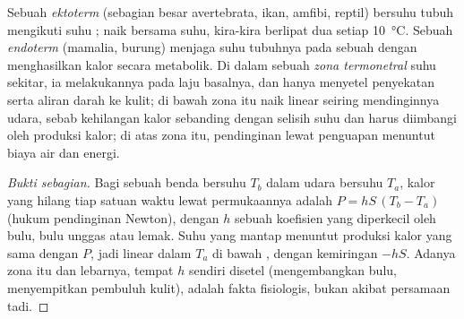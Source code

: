 \begin{proposition}\label{prop:b1:organism-environment:thermo}
Sebuah \emph{ektoterm} (sebagian besar avertebrata,
ikan, amfibi, reptil) bersuhu tubuh mengikuti suhu ;  naik bersama suhu, kira-kira berlipat dua setiap
\qty{10}{\celsius}. Sebuah \emph{endoterm} (mamalia,
burung) menjaga suhu tubuhnya pada sebuah  dengan
menghasilkan kalor secara metabolik. Di dalam sebuah \emph{zona
termonetral} suhu sekitar, ia melakukannya pada
laju basalnya, dan hanya menyetel penyekatan serta aliran darah ke
kulit; di bawah zona itu  naik linear seiring
mendinginnya udara, sebab kehilangan kalor sebanding dengan selisih suhu
dan harus diimbangi oleh produksi kalor; di atas zona itu, pendinginan
lewat penguapan menuntut biaya air dan energi.
\end{proposition}
\begin{proof}[Bukti sebagian]
Bagi sebuah benda bersuhu $T_b$ dalam udara bersuhu $T_a$, kalor yang
hilang tiap satuan waktu lewat permukaannya adalah $P = hS\,(T_b - T_a)$
(hukum pendinginan Newton), dengan $h$ sebuah koefisien yang diperkecil
oleh bulu, bulu unggas atau lemak. Suhu yang mantap menuntut produksi
kalor yang sama dengan $P$, jadi linear dalam $T_a$ di bawah , dengan kemiringan $-hS$. Adanya zona itu dan lebarnya,
tempat $h$ sendiri disetel (mengembangkan bulu, menyempitkan pembuluh
kulit), adalah fakta fisiologis, bukan akibat persamaan tadi.
\end{proof}


